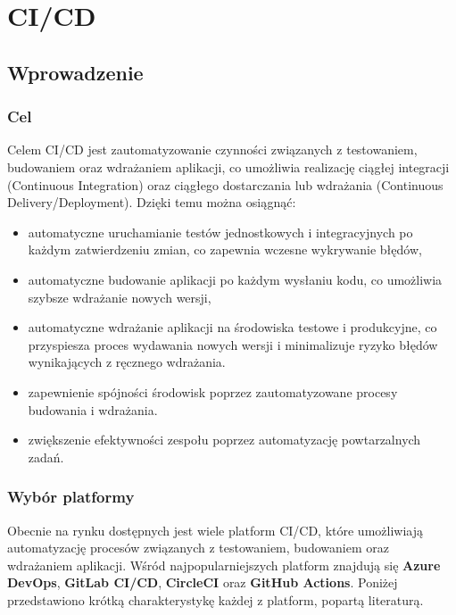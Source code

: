 \documentclass{article}
\begin{document}
\section{CI/CD} \label{sectionCICD}

\subsection{Wprowadzenie}

\subsubsection{Cel}

Celem CI/CD jest zautomatyzowanie czynności związanych z testowaniem, budowaniem oraz wdrażaniem aplikacji, co umożliwia realizację ciągłej integracji (Continuous Integration) oraz ciągłego dostarczania lub wdrażania (Continuous Delivery/Deployment). Dzięki temu można osiągnąć:

\begin{itemize}
    \item automatyczne uruchamianie testów jednostkowych i integracyjnych po każdym zatwierdzeniu zmian, co zapewnia wczesne wykrywanie błędów,
    \item automatyczne budowanie aplikacji po każdym wysłaniu kodu, co umożliwia szybsze wdrażanie nowych wersji,
    \item automatyczne wdrażanie aplikacji na środowiska testowe i produkcyjne, co przyspiesza proces wydawania nowych wersji i minimalizuje ryzyko błędów wynikających z ręcznego wdrażania.
    \item zapewnienie spójności środowisk poprzez zautomatyzowane procesy budowania i wdrażania.
    \item zwiększenie efektywności zespołu poprzez automatyzację powtarzalnych zadań.
\end{itemize}

\subsubsection{Wybór platformy}

Obecnie na rynku dostępnych jest wiele platform CI/CD, które umożliwiają automatyzację procesów związanych z testowaniem, budowaniem oraz wdrażaniem aplikacji. Wśród najpopularniejszych platform znajdują się \textbf{Azure DevOps}, \textbf{GitLab CI/CD}, \textbf{CircleCI} oraz \textbf{GitHub Actions}. Poniżej przedstawiono krótką charakterystykę każdej z platform, popartą literaturą.
\end{document}
